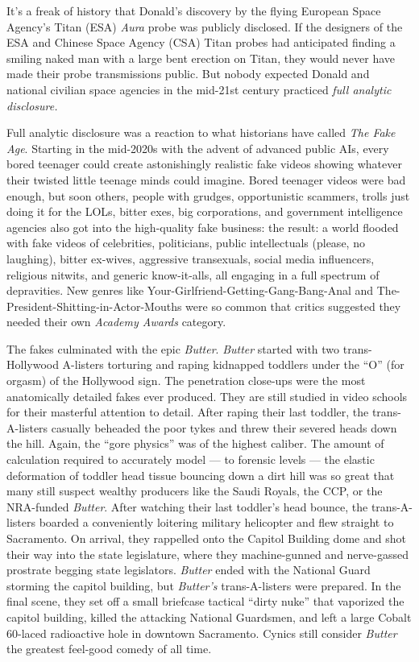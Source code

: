 It's a freak of history that Donald's discovery by the flying European
Space Agency's Titan (ESA) \emph{Aura} probe was publicly disclosed. If
the designers of the ESA and Chinese Space Agency (CSA) Titan probes had
anticipated finding a smiling naked man with a large bent erection on
Titan, they would never have made their probe transmissions public. But
nobody expected Donald and national civilian space agencies in the
mid-21st century practiced \emph{full analytic disclosure.}

Full analytic disclosure was a reaction to what historians have called
\emph{The Fake Age}. Starting in the mid-2020s with the advent of
advanced public AIs, every bored teenager could create astonishingly
realistic fake videos showing whatever their twisted little teenage
minds could imagine. Bored teenager videos were bad enough, but soon
others, people with grudges, opportunistic scammers, trolls just doing
it for the LOLs, bitter exes, big corporations, and government
intelligence agencies also got into the high-quality fake business: the
result: a world flooded with fake videos of celebrities, politicians,
public intellectuals (please, no laughing), bitter ex-wives, aggressive
transexuals, social media influencers, religious nitwits, and generic
know-it-alls, all engaging in a full spectrum of depravities. New genres
like Your-Girlfriend-Getting-Gang-Bang-Anal and
The-President-Shitting-in-Actor-Mouths were so common that critics
suggested they needed their own \emph{Academy Awards} category.

The fakes culminated with the epic \emph{Butter}. \emph{Butter} started
with two trans-Hollywood A-listers torturing and raping kidnapped
toddlers under the ``O'' (for orgasm) of the Hollywood sign. The
penetration close-ups were the most anatomically detailed fakes ever
produced. They are still studied in video schools for their masterful
attention to detail. After raping their last toddler, the
trans-A-listers casually beheaded the poor tykes and threw their severed
heads down the hill. Again, the ``gore physics'' was of the highest
caliber. The amount of calculation required to accurately model --- to
forensic levels --- the elastic deformation of toddler head tissue
bouncing down a dirt hill was so great that many still suspect wealthy
producers like the Saudi Royals, the CCP, or the NRA-funded
\emph{Butter}. After watching their last toddler's head bounce, the
trans-A-listers boarded a conveniently loitering military helicopter and
flew straight to Sacramento. On arrival, they rappelled onto the Capitol
Building dome and shot their way into the state legislature, where they
machine-gunned and nerve-gassed prostrate begging state legislators.
\emph{Butter} ended with the National Guard storming the capitol
building, but \emph{Butter's} trans-A-listers were prepared. In the
final scene, they set off a small briefcase tactical ``dirty nuke'' that
vaporized the capitol building, killed the attacking National Guardsmen,
and left a large Cobalt 60-laced radioactive hole in downtown
Sacramento. Cynics still consider \emph{Butter} the greatest feel-good
comedy of all time.

